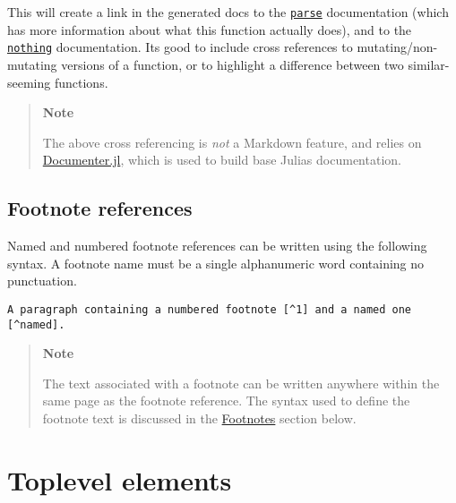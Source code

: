This will create a link in the generated docs to the \hyperlink{14207407853646164654}{\texttt{parse}} documentation (which has more information about what this function actually does), and to the \hyperlink{9331422207248206047}{\texttt{nothing}} documentation. It{\textquotesingle}s good to include cross references to mutating/non-mutating versions of a function, or to highlight a difference between two similar-seeming functions.



\begin{quote}
\textbf{Note}

The above cross referencing is \emph{not} a Markdown feature, and relies on \href{https://github.com/JuliaDocs/Documenter.jl}{Documenter.jl}, which is used to build base Julia{\textquotesingle}s documentation.

\end{quote}


\hypertarget{1886176754537713588}{}


\subsection{Footnote references}



Named and numbered footnote references can be written using the following syntax. A footnote name must be a single alphanumeric word containing no punctuation.




\begin{lstlisting}
A paragraph containing a numbered footnote [^1] and a named one [^named].
\end{lstlisting}



\begin{quote}
\textbf{Note}

The text associated with a footnote can be written anywhere within the same page as the footnote reference. The syntax used to define the footnote text is discussed in the \hyperlink{16845496644619434430}{Footnotes} section below.

\end{quote}


\hypertarget{1299449328577314863}{}


\section{Toplevel elements}



